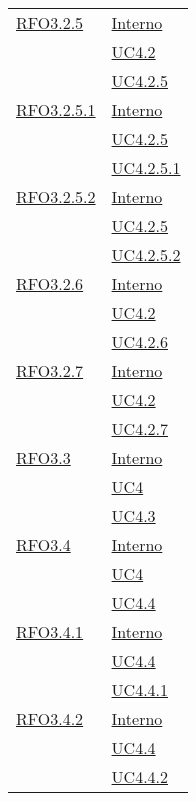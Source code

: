 \begin{longtable}{|>{\centering}m{5cm}|m{5cm}<{\centering}|}
\hyperlink{RFO3.2.5}{RFO3.2.5} &  \hyperlink{Interno}{Interno}\\ &\hyperref[UC4.2]{UC4.2}\\ &\hyperref[UC4.2.5]{UC4.2.5}\\ \hline

\hyperlink{RFO3.2.5.1}{RFO3.2.5.1} &  \hyperlink{Interno}{Interno}\\ &\hyperref[UC4.2.5]{UC4.2.5}\\ &\hyperref[UC4.2.5.1]{UC4.2.5.1}\\ \hline

\hyperlink{RFO3.2.5.2}{RFO3.2.5.2} &  \hyperlink{Interno}{Interno}\\ &\hyperref[UC4.2.5]{UC4.2.5}\\ &\hyperref[UC4.2.5.2]{UC4.2.5.2}\\ \hline

\hyperlink{RFO3.2.6}{RFO3.2.6} &  \hyperlink{Interno}{Interno}\\ &\hyperref[UC4.2]{UC4.2}\\ &\hyperref[UC4.2.6]{UC4.2.6}\\ \hline

\hyperlink{RFO3.2.7}{RFO3.2.7} &  \hyperlink{Interno}{Interno}\\ &\hyperref[UC4.2]{UC4.2}\\ &\hyperref[UC4.2.7]{UC4.2.7}\\ \hline

\hyperlink{RFO3.3}{RFO3.3} &  \hyperlink{Interno}{Interno}\\ &\hyperref[UC4]{UC4}\\ &\hyperref[UC4.3]{UC4.3}\\ \hline

\hyperlink{RFO3.4}{RFO3.4} &  \hyperlink{Interno}{Interno}\\ &\hyperref[UC4]{UC4}\\ &\hyperref[UC4.4]{UC4.4}\\ \hline

\hyperlink{RFO3.4.1}{RFO3.4.1} & \hyperlink{Interno}{Interno}\\ &\hyperref[UC4.4]{UC4.4}\\ &\hyperref[UC4.4.1]{UC4.4.1}\\ \hline

\hyperlink{RFO3.4.2}{RFO3.4.2} &  \hyperlink{Interno}{Interno}\\ &\hyperref[UC4.4]{UC4.4}\\ &\hyperref[UC4.4.2]{UC4.4.2}\\ \hline


\end{longtable}
